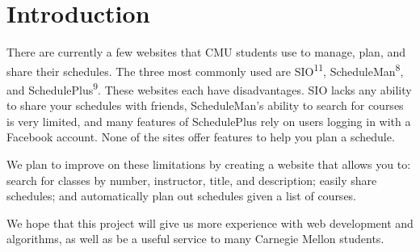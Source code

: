 \section{Introduction}
\setcounter{page}{1}  %
There are currently a few websites that CMU students use to manage, plan, and
share their schedules. The three most commonly used are SIO\textsuperscript{11}, ScheduleMan\textsuperscript{8}, and
SchedulePlus\textsuperscript{9}. These websites each have disadvantages. SIO lacks any ability to
share your schedules with friends, ScheduleMan's ability to search for courses
is very limited, and many features of SchedulePlus rely on users logging in with
a Facebook account.  None of the sites offer features to help you plan
a schedule.

We plan to improve on these limitations by creating a website that allows you
to: search for classes by number, instructor, title, and description; easily
share schedules; and automatically plan out schedules given a list of courses.

We hope that this project will give us more experience with web development and algorithms,
as well as be a useful service to many Carnegie Mellon students.
